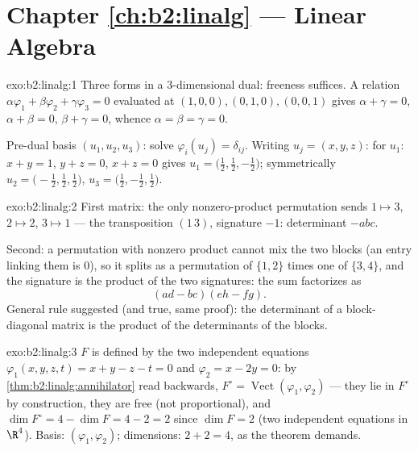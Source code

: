 \section*{Chapter \ref{ch:b2:linalg} --- Linear Algebra}

\begin{solution}{exo:b2:linalg:1}
Three forms in a $3$-dimensional dual: freeness suffices. A relation
$\alpha\varphi_1 + \beta\varphi_2 + \gamma\varphi_3 = 0$ evaluated at
$(1,0,0), (0,1,0), (0,0,1)$ gives $\alpha + \gamma = 0$, $\alpha +
\beta = 0$, $\beta + \gamma = 0$, whence $\alpha = \beta = \gamma =
0$.

Pre-dual basis $(u_1, u_2, u_3)$: solve $\varphi_i(u_j) =
\delta_{ij}$. Writing $u_j = (x, y, z)$: for $u_1$: $x + y = 1$,
$y + z = 0$, $x + z = 0$ gives $u_1 = \bigl(\tfrac12, \tfrac12,
-\tfrac12\bigr)$; symmetrically $u_2 = \bigl(-\tfrac12, \tfrac12,
\tfrac12\bigr)$, $u_3 = \bigl(\tfrac12, -\tfrac12, \tfrac12\bigr)$.
\end{solution}

\begin{solution}{exo:b2:linalg:2}
First matrix: the only nonzero-product permutation sends $1 \mapsto
3$, $2 \mapsto 2$, $3 \mapsto 1$ --- the transposition $(1\,3)$,
signature $-1$: determinant $-abc$.

Second: a permutation with nonzero product cannot mix the two
blocks (an entry linking them is $0$), so it splits as a permutation
of $\{1,2\}$ times one of $\{3,4\}$, and the signature is the
product of the two signatures: the sum factorizes as
\[
(ad - bc)(eh - fg) .
\]
General rule suggested (and true, same proof): the determinant of a
block-diagonal matrix is the product of the determinants of the
blocks.
\end{solution}

\begin{solution}{exo:b2:linalg:3}
$F$ is defined by the two independent equations $\varphi_1(x,y,z,t)
= x + y - z - t = 0$ and $\varphi_2 = x - 2y = 0$: by
\cref{thm:b2:linalg:annihilator} read backwards, $F^\circ =
\operatorname{Vect}(\varphi_1, \varphi_2)$ --- they lie in $F^\circ$
by construction, they are free (not proportional), and $\dim F^\circ
= 4 - \dim F = 4 - 2 = 2$ since $\dim F = 2$ (two independent
equations in $\R^4$). Basis: $(\varphi_1, \varphi_2)$; dimensions:
$2 + 2 = 4$, as the theorem demands.
\end{solution}

